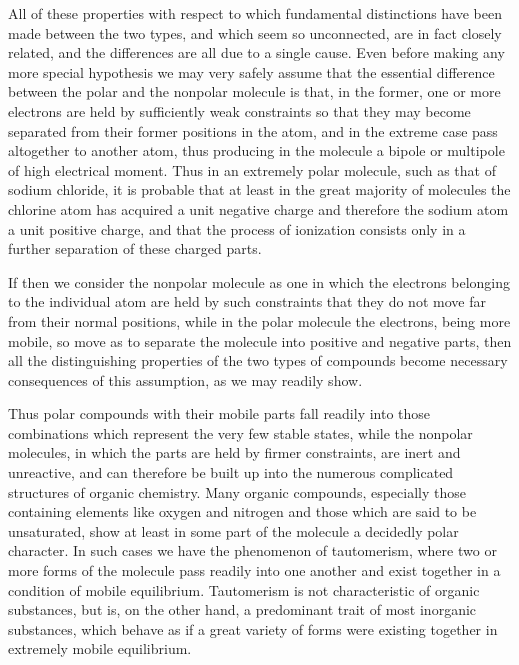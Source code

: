 \documentclass[11pt]{memoir}
\begin{document}
All of these properties with respect to which fundamental distinctions have been made between the two types, and which seem so unconnected, are in fact closely related, and the differences are all due to a single cause.  Even before making any more special hypothesis we may very safely assume that the essential difference between the polar and the nonpolar molecule is that, in the former, one or more electrons are held by sufficiently weak constraints so that they may become separated from their former positions in the atom, and in the extreme case pass altogether to another atom, thus producing in the molecule a bipole or multipole of high electrical moment.  Thus in an extremely polar molecule, such as that of sodium chloride, it is probable that at least in the great majority of molecules the chlorine atom has acquired a unit negative charge and therefore the sodium atom a unit positive charge, and that the process of ionization consists only in a further separation of these charged parts.

If then we consider the nonpolar molecule as one in which the electrons belonging to the individual atom are held by such constraints that they do not move far from their normal positions, while in the polar molecule the electrons, being more mobile, so move as to separate the molecule into positive and negative parts, then all the distinguishing properties of the two types of compounds become necessary consequences of this assumption, as we may readily show.

Thus polar compounds with their mobile parts fall readily into those combinations which represent the very few stable states, while the nonpolar molecules, in which the parts are held by firmer constraints, are inert and unreactive, and can therefore be built up into the numerous complicated structures of organic chemistry.  Many organic compounds, especially those containing elements like oxygen and nitrogen and those which are said to be unsaturated, show at least in some part of the molecule a decidedly polar character.  In such cases we have the phenomenon of tautomerism, where two or more forms of the molecule pass readily into one another and exist together in a condition of mobile equilibrium.  Tautomerism is not characteristic of organic substances, but is, on the other hand, a predominant trait of most inorganic substances, which behave as if a great variety of forms were existing together in extremely mobile equilibrium.
\end{document}
